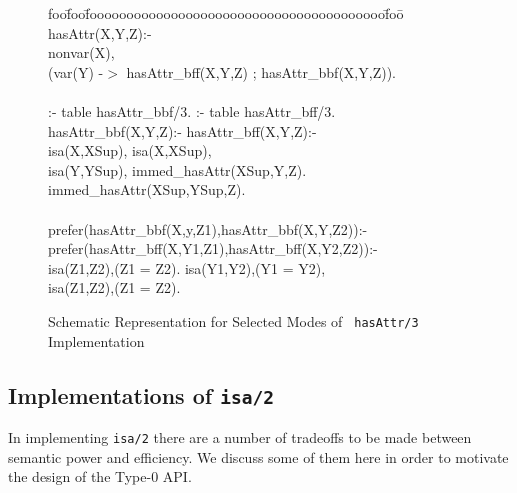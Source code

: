 \begin{figure}[htb] 
{\small {\sf  
\begin{tabbing}
foo\=foo\=foooooooooooooooooooooooooooooooooooooooo\=foo\=\kill
%
\> hasAttr(X,Y,Z):- \\
\> \> 	nonvar(X), \\
\> \> 	(var(Y) -$>$ hasAttr\_bff(X,Y,Z) ; hasAttr\_bbf(X,Y,Z)). \\
	   \\
\> :- table hasAttr\_bbf/3. \> \> :- table hasAttr\_bff/3.\\
\> hasAttr\_bbf(X,Y,Z):-  \> \> hasAttr\_bff(X,Y,Z):-  \\
\> \> 	isa(X,XSup), 	\> \> 	isa(X,XSup), \\
\> \> 	isa(Y,YSup), 	\> \>  	immed\_hasAttr(XSup,Y,Z). \\
\>  \> 	immed\_hasAttr(XSup,YSup,Z). \\
\\
\> prefer(hasAttr\_bbf(X,y,Z1),hasAttr\_bbf(X,Y,Z2)):-  
\> \> prefer(hasAttr\_bff(X,Y1,Z1),hasAttr\_bff(X,Y2,Z2)):-  \\
\> \> 	isa(Z1,Z2),\pnot(Z1 = Z2). 
\> \> 	isa(Y1,Y2),\pnot(Y1 = Y2), \\
\> \> \> \> 	isa(Z1,Z2),\pnot(Z1 = Z2).
%
\end{tabbing} } }
\caption{Schematic Representation for Selected Modes of {\tt
hasAttr/3} Implementation} 
\label{fig:preference}
\end{figure}

\subsection{Implementations of {\tt isa/2}} \label{sec:isaimpl}

In implementing {\tt isa/2} there are a number of tradeoffs to be made
between semantic power and efficiency.  We discuss some of them here
in order to motivate the design of the Type-0 API.

